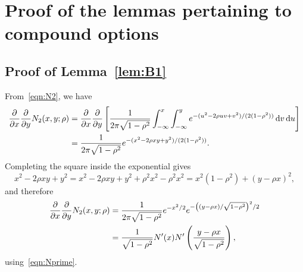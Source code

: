 \chapter{Proof of the lemmas pertaining to compound options}

\section{Proof of Lemma~\ref{lem:B1}}
From~\eqref{eqn:N2}, we have
			\begin{align*}
				\frac{\partial}{\partial x}\frac{\partial}{\partial y} N_2(x,y;\rho) &= \frac{\partial}{\partial x}\frac{\partial}{\partial y}\left[ \frac{1}{2\pi\sqrt{1-\rho^2}} \int_{-\infty}^x\int_{-\infty}^y e^{-(u^2-2\rho uv + v^2)/(2(1-\rho^2))} \, \mathrm d v \, \mathrm d u \right] \\
				&= \frac{1}{2\pi\sqrt{1-\rho^2}}e^{-(x^2-2\rho xy + y^2)/(2(1-\rho^2))}.		\end{align*}
		Completing the square inside the exponential gives
			\begin{equation*}
				x^2 - 2\rho xy + y^2 = x^2 - 2\rho xy + y^2 + \rho^2 x^2 - \rho^2 x^2 = x^2(1-\rho^2) + (y-\rho x)^2,
			\end{equation*}
		and therefore
			\begin{align*}
				\frac{\partial}{\partial x}\frac{\partial}{\partial y} N_2(x,y;\rho) &= \frac{1}{2\pi\sqrt{1-\rho^2}} e^{-x^2/2}e^{-\left((y-\rho x)/\sqrt{1-\rho^2}\right)^2/2}\\
				&= \frac{1}{\sqrt{1-\rho^2}}N'(x)N'\left( \frac{y-\rho x}{\sqrt{1-\rho^2}} \right),
			\end{align*}
		using~\eqref{eqn:Nprime}.

